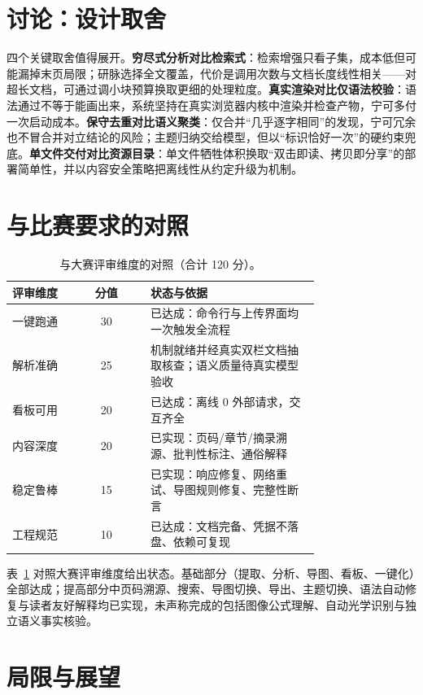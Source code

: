 \documentclass[11pt]{article}
\begin{document}
\section{讨论：设计取舍}

四个关键取舍值得展开。\textbf{穷尽式分析对比检索式}：检索增强只看子集，成本低但可能漏掉末页局限；研脉选择全文覆盖，代价是调用次数与文档长度线性相关——对超长文档，可通过调小块预算换取更细的处理粒度。\textbf{真实渲染对比仅语法校验}：语法通过不等于能画出来，系统坚持在真实浏览器内核中渲染并检查产物，宁可多付一次启动成本。\textbf{保守去重对比语义聚类}：仅合并“几乎逐字相同”的发现，宁可冗余也不冒合并对立结论的风险；主题归纳交给模型，但以“标识恰好一次”的硬约束兜底。\textbf{单文件交付对比资源目录}：单文件牺牲体积换取“双击即读、拷贝即分享”的部署简单性，并以内容安全策略把离线性从约定升级为机制。

\section{与比赛要求的对照}

\begin{table}[t]
\centering
\small
\setlength{\tabcolsep}{3pt}
\begin{tabular}{@{}p{0.20\linewidth}c p{0.55\linewidth}@{}}
\toprule
\textbf{评审维度} & \textbf{分值} & \textbf{状态与依据} \\
\midrule
一键跑通 & 30 & 已达成：命令行与上传界面均一次触发全流程 \\
解析准确 & 25 & 机制就绪并经真实双栏文档抽取核查；语义质量待真实模型验收 \\
看板可用 & 20 & 已达成：离线 0 外部请求，交互齐全 \\
内容深度 & 20 & 已实现：页码/章节/摘录溯源、批判性标注、通俗解释 \\
稳定鲁棒 & 15 & 已实现：响应修复、网络重试、导图规则修复、完整性断言 \\
工程规范 & 10 & 已达成：文档完备、凭据不落盘、依赖可复现 \\
\bottomrule
\end{tabular}
\caption{与大赛评审维度的对照（合计 120 分）。}
\label{tab:rubric}
\end{table}

表~\ref{tab:rubric} 对照大赛评审维度给出状态。基础部分（提取、分析、导图、看板、一键化）全部达成；提高部分中页码溯源、搜索、导图切换、导出、主题切换、语法自动修复与读者友好解释均已实现，未声称完成的包括图像公式理解、自动光学识别与独立语义事实核验。

\section{局限与展望}
\end{document}
